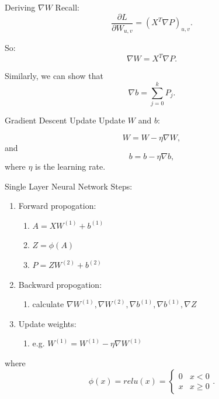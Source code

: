 \documentclass{beamer}
\begin{document}
  \begin{frame}{Deriving $\nabla W$}
    Recall: $$\frac{\partial L}{\partial W_{u, v}} =  \left( X^T \nabla P
    \right)_{u, v}.$$

    So:
    $$ \nabla W = X^T \nabla P. $$

    Similarly, we can show that
    $$ \nabla b = \sum_{j=0}^k P_j. $$
  \end{frame}

  \begin{frame}{Gradient Descent Update}
    Update $W$ and $b$:
    \begin{center}
      $$ W = W - \eta \nabla W, $$
      and
      $$ b = b - \eta \nabla b, $$
      where $\eta$ is the learning rate.
    \end{center}

  \end{frame}

  \begin{frame}{Single Layer Neural Network}
    Steps:
    \begin{enumerate}
      \item Forward propogation:
      \begin{enumerate}
        \item $ A = XW^{(1)} + b^{(1)} $
        \item $ Z = \phi(A) $
        \item $ P = ZW^{(2)} + b^{(2)} $
      \end{enumerate}

      \item Backward propogation:
      \begin{enumerate}
        \item calculate $\nabla W^{(1)}, \nabla W^{(2)}, \nabla b^{(1)},
              \nabla b^{(1)}, \nabla Z$
      \end{enumerate}
      \item Update weights:
        \begin{enumerate}
          \item e.g. $W^{(1)} = W^{(1)} - \eta \nabla W^{(1)}$
        \end{enumerate}
    \end{enumerate}

    where
    $$ \phi(x) = relu(x) =
      \begin{cases}
        0 & x < 0\\
        x & x \geq 0
      \end{cases}.$$
  \end{frame}
\end{document}
